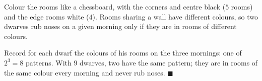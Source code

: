 Colour the rooms like a chessboard, with the corners and centre black ($5$ rooms) and the edge rooms white ($4$). Rooms sharing a wall have different colours, so two dwarves rub noses on a given morning only if they are in rooms of different colours.

Record for each dwarf the colours of his rooms on the three mornings: one of $2^3=8$ patterns. With $9$ dwarves, two have the same pattern; they are in rooms of the same colour every morning and never rub noses. $\blacksquare$
